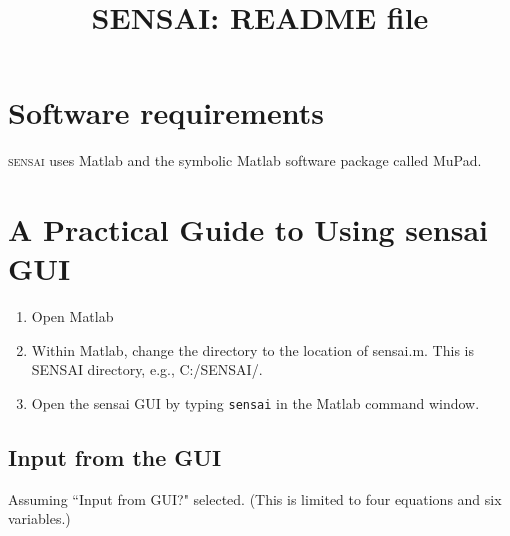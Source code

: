 \documentclass[12pt]{article}
\newcommand{\sensai}{\textsc{sensai}}
\begin{document}
\title{SENSAI: README file}
\date{}
\maketitle

\pagestyle{empty}

\section{Software requirements}

{\sensai} uses M{\sc atlab} and the symbolic M{\sc atlab} software package called MuPad.


\section{A Practical Guide to Using {\sc sensai} GUI}

\begin{enumerate}
    \item Open M{\sc atlab}
    \item Within M{\sc atlab}, change the directory to the location of sensai.m. This is SENSAI directory, e.g., C:/SENSAI/.
    \item Open the {\sc sensai} GUI by typing {\tt sensai} in the M{\sc atlab} command window.
\end{enumerate}

\subsection{Input from the GUI}

Assuming ``Input from GUI?" selected. (This is limited to four equations and six variables.)
\end{document}
